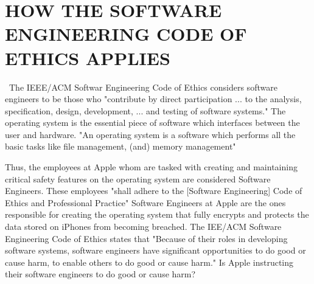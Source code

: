 \section{HOW THE SOFTWARE ENGINEERING CODE OF ETHICS APPLIES}\
The IEEE/ACM Softwar Engineering Code of Ethics considers software engineers to be those who "contribute by direct participation ... to the analysis, specification, design, development, ... and testing of software systems." \cite{code}
The operating system is the essential piece of software which interfaces between the user and hardware. "An operating system is a software which performs all the basic tasks like file management, (and) memory management" \cite{tutorialspoint}\par

Thus, the employees at Apple whom are tasked with creating and maintaining critical safety features on the operating system are considered Software Engineers. These employees "shall adhere to the [Software Engineering] Code of Ethics and Professional Practice" \cite{code}
Software Engineers at Apple are the ones responsible for creating the operating system that fully encrypts and protects the data stored on iPhones from becoming breached. The IEE/ACM Software Engineering Code of Ethics states that "Because of their roles in developing software systems, software engineers have significant opportunities to do good or cause harm, to enable others to do good or cause harm." \cite{code} Is Apple instructing their software engineers to do good or cause harm? \par


\vspace{0.4cm}
